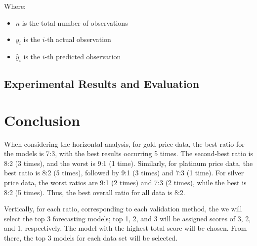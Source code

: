 \documentclass{ieeeojies}
\begin{document}
\indent Where:
\begin{itemize}
    \item $n$ is the total number of observations
    \item $y_i$ is the $i$-th actual observation
    \item $\hat{y}_i$ is the $i$-th predicted observation
\end{itemize}

\subsection{Experimental Results and Evaluation}

\section{Conclusion}

\indent When considering the horizontal analysis, for gold price data, the best ratio for the models is 7:3, with the best results occurring 5 times. The second-best ratio is 8:2 (3 times), and the worst is 9:1 (1 time). Similarly, for platinum price data, the best ratio is 8:2 (5 times), followed by 9:1 (3 times) and 7:3 (1 time). For silver price data, the worst ratios are 9:1 (2 times) and 7:3 (2 times), while the best is 8:2 (5 times). Thus, the best overall ratio for all data is 8:2.

\indent Vertically, for each ratio, corresponding to each validation method, the we will select the top 3 forecasting models; top 1, 2, and 3 will be assigned scores of 3, 2, and 1, respectively. The model with the highest total score will be chosen. From there, the top 3 models for each data set will be selected.
\end{document}
